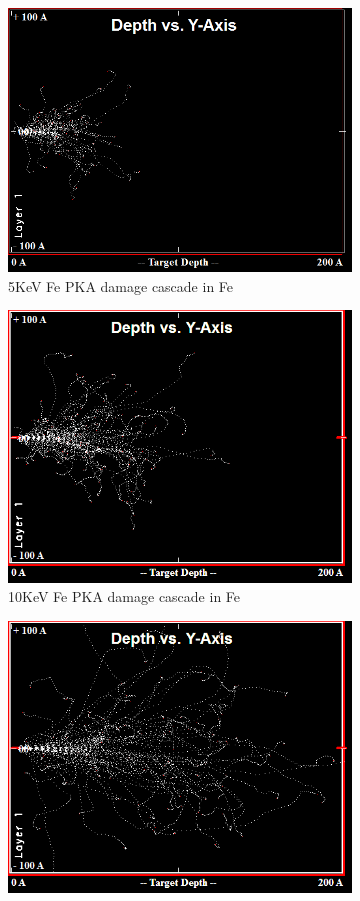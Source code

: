 \begin{figure}
\begin{subfigure}{.5\textwidth}
  \centering
  \includegraphics[width=.7\linewidth]{chapters/introduction/images/5KeV.png}
  \caption{5KeV Fe PKA damage cascade in Fe} 
\label{fig:damagecascade5kev}
\end{subfigure}
\begin{subfigure}{.5\textwidth}
  \centering
  \includegraphics[width=.7\linewidth]{chapters/introduction/images/10KeV.png}
  \caption{10KeV Fe PKA damage cascade in Fe} 
  \label{fig:damagecascade10kev}
\end{subfigure}
\begin{subfigure}{.5\textwidth}
  \centering
  \includegraphics[width=.7\linewidth]{chapters/introduction/images/20KeV.png}

\end{subfigure}
\end{figure}
